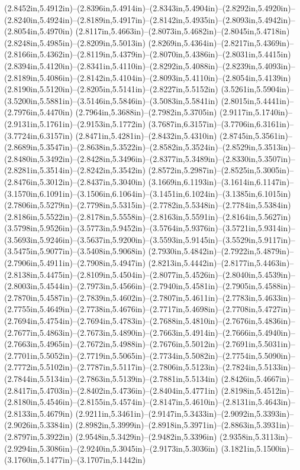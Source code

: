 (2.8452in,5.4912in)--(2.8396in,5.4914in)--(2.8343in,5.4904in)--(2.8292in,5.4920in)--(2.8240in,5.4924in)--(2.8189in,5.4917in)--(2.8142in,5.4935in)--(2.8093in,5.4942in)--(2.8054in,5.4970in) (2.8117in,5.4663in)--(2.8073in,5.4682in)--(2.8045in,5.4718in) (2.8248in,5.4985in)--(2.8209in,5.5013in) (2.8269in,5.4364in)--(2.8217in,5.4369in)--(2.8166in,5.4362in)--(2.8119in,5.4379in)--(2.8070in,5.4386in)--(2.8031in,5.4415in) (2.8394in,5.4120in)--(2.8341in,5.4110in)--(2.8292in,5.4088in)--(2.8239in,5.4093in)--(2.8189in,5.4086in)--(2.8142in,5.4104in)--(2.8093in,5.4110in)--(2.8054in,5.4139in) (2.8190in,5.5120in)--(2.8205in,5.5141in)--(2.8227in,5.5152in) (3.5261in,5.5904in)--(3.5200in,5.5881in)--(3.5146in,5.5846in)--(3.5083in,5.5841in) (2.8015in,5.4441in)--(2.7976in,5.4470in) (2.7964in,5.3688in)--(2.7982in,5.3705in) (2.9117in,5.1740in)--(2.9131in,5.1761in)--(2.9153in,5.1772in) (3.7687in,6.3157in)--(3.7706in,6.3161in)--(3.7724in,6.3157in) (2.8471in,5.4281in)--(2.8432in,5.4310in) (2.8745in,5.3561in)--(2.8689in,5.3547in)--(2.8638in,5.3522in)--(2.8582in,5.3524in)--(2.8529in,5.3513in)--(2.8480in,5.3492in)--(2.8428in,5.3496in)--(2.8377in,5.3489in)--(2.8330in,5.3507in)--(2.8281in,5.3514in)--(2.8242in,5.3542in) (2.8572in,5.2987in)--(2.8525in,5.3005in)--(2.8476in,5.3012in)--(2.8437in,5.3040in) (3.1669in,6.1193in)--(3.1614in,6.1147in)--(3.1570in,6.1091in)--(3.1506in,6.1064in)--(3.1451in,6.1024in)--(3.1385in,6.1015in) (2.7806in,5.5279in)--(2.7798in,5.5315in)--(2.7782in,5.5348in)--(2.7784in,5.5384in) (2.8186in,5.5522in)--(2.8178in,5.5558in)--(2.8163in,5.5591in)--(2.8164in,5.5627in) (3.5798in,5.9526in)--(3.5773in,5.9452in)--(3.5764in,5.9376in)--(3.5721in,5.9314in)--(3.5693in,5.9246in)--(3.5637in,5.9200in)--(3.5593in,5.9145in)--(3.5529in,5.9117in)--(3.5475in,5.9077in)--(3.5408in,5.9068in) (2.7930in,5.4842in)--(2.7922in,5.4879in)--(2.7906in,5.4911in)--(2.7908in,5.4947in) (2.8213in,5.4442in)--(2.8177in,5.4463in)--(2.8138in,5.4475in)--(2.8109in,5.4504in)--(2.8077in,5.4526in)--(2.8040in,5.4539in)--(2.8003in,5.4544in)--(2.7973in,5.4566in)--(2.7940in,5.4581in)--(2.7905in,5.4588in)--(2.7870in,5.4587in)--(2.7839in,5.4602in)--(2.7807in,5.4611in)--(2.7783in,5.4633in)--(2.7755in,5.4649in)--(2.7738in,5.4676in)--(2.7717in,5.4698in)--(2.7708in,5.4727in)--(2.7694in,5.4754in)--(2.7694in,5.4783in)--(2.7688in,5.4810in)--(2.7676in,5.4836in)--(2.7677in,5.4863in)--(2.7673in,5.4890in)--(2.7663in,5.4914in)--(2.7666in,5.4940in)--(2.7663in,5.4965in)--(2.7672in,5.4988in)--(2.7676in,5.5012in)--(2.7691in,5.5031in)--(2.7701in,5.5052in)--(2.7719in,5.5065in)--(2.7734in,5.5082in)--(2.7754in,5.5090in)--(2.7772in,5.5102in)--(2.7787in,5.5117in)--(2.7806in,5.5123in)--(2.7824in,5.5133in)--(2.7844in,5.5134in)--(2.7863in,5.5139in)--(2.7881in,5.5134in) (2.8426in,5.4667in)--(2.8417in,5.4703in)--(2.8402in,5.4736in)--(2.8404in,5.4771in) (2.8198in,5.4512in)--(2.8180in,5.4546in)--(2.8155in,5.4574in)--(2.8147in,5.4610in)--(2.8131in,5.4643in)--(2.8133in,5.4679in) (2.9211in,5.3461in)--(2.9147in,5.3433in)--(2.9092in,5.3393in)--(2.9026in,5.3384in) (2.8982in,5.3999in)--(2.8918in,5.3971in)--(2.8863in,5.3931in)--(2.8797in,5.3922in) (2.9548in,5.3429in)--(2.9482in,5.3396in) (2.9358in,5.3113in)--(2.9294in,5.3086in)--(2.9240in,5.3045in)--(2.9173in,5.3036in) (3.1821in,5.1500in)--(3.1760in,5.1477in)--(3.1707in,5.1442in) 